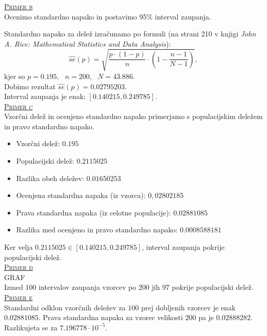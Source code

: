 \documentclass[a4paper,12pt]{article}
\begin{document}

\noindent
\textsc{\underline{Primer b}}
\\
Ocenimo standardno napako in postavimo 95\% interval zaupanja.

\noindent
Standardno napako za delež izračunamo po formuli (na strani 210 v knjigi \textit{John A. Rice: Mathematical Statistics and Data Analysis}):
$$ \hat{se}(p) = \sqrt{ \frac{p \cdot (1-p)}{n} \cdot \left(1 - \frac{n - 1}{N - 1} \right)}, $$
kjer so $p = 0.195$, \ $n = 200$, \ $N = 43.886$. 
\\
Dobimo rezultat $\hat{se}(p) = 0.02795203$.
\\
Interval zaupanja je enak: $[0.140215, 0.249785]$.
\\


\noindent
\textsc{\underline{Primer c}}
\\
Vzorčni delež in ocenjeno standardno napako primerjamo s populacijskim deležem in pravo standardno napako. 
\\
\begin{itemize}
\item Vzorčni delež: $0.195$ 
\item Populacijski delež: $0.2115025$ 
\item Razlika obeh deležev: $0.01650253$
\item Ocenjena standardna napaka (iz vzorca): $0,02802185$
\item Prava standardna napaka (iz celotne populacije):  $0.02881085$
\item Razlika med ocenjeno in pravo standardno napako: $0.0008588181$
\end{itemize}
Ker velja $0.2115025 \in [0.140215, 0.249785]$, interval zaupanja pokrije populacijski delež.
\\


\noindent
\textsc{\underline{Primer d}}
\\
GRAF 
\\
Izmed 100 intervalov zaupanja vzorcev po 200 jih 97 pokrije populacijski delež.
\\


\noindent
\textsc{\underline{Primer e}}
\\
Standardni odklon vzorčnih deležev za $100$ prej dobljenih vzorcev je enak $0.02881085$. Prava standardna napaka za vzorec velikosti $200$ pa je $0.02888282$.
Razlikujeta se za $7.196778 \cdot 10^{-5}$.
\\
\end{document}
